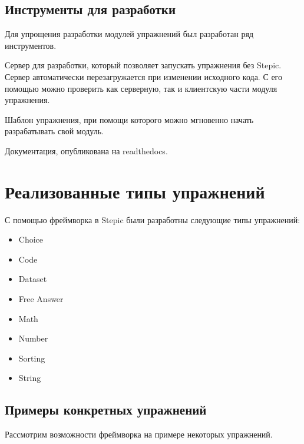 \documentclass{matmex-diploma-custom}
\begin{document}
\subsection{Инструменты для разработки}
Для упрощения разработки модулей упражнений был разработан ряд
инструментов.

Сервер для разработки, который позволяет запускать упражнения без
Stepic. Сервер автоматически перезагружается при изменении исходного
кода. С его помощью можно проверить как серверную, так и клиентскую
части модуля упражнения.

Шаблон упражнения, при помощи которого можно мгновенно начать
разрабатывать свой модуль.

Документация, опубликована на readthedocs\cite{plugins:doc}.

\section{Реализованные типы упражнений}

С помощью фреймворка в Stepic были разработны следующие типы упражнений:
\begin{itemize}
\item Choice
\item Code
\item Dataset
\item Free Answer
\item Math
\item Number
\item Sorting
\item String
\end{itemize}

\subsection{Примеры конкретных упражнений}
Рассмотрим возможности фреймворка на примере некоторых упражнений.
\end{document}
